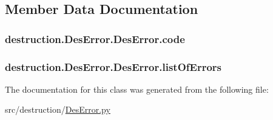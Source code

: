 \subsection{Member Data Documentation}
\hypertarget{classdestruction_1_1_des_error_1_1_des_error_a5d58c4eee2db20e1ebd7b920e5b7a2cd}{
\subsubsection[{code}]{\setlength{\rightskip}{0pt plus 5cm}destruction.\-Des\-Error.\-Des\-Error.\-code}}\label{classdestruction_1_1_des_error_1_1_des_error_a5d58c4eee2db20e1ebd7b920e5b7a2cd}
\hypertarget{classdestruction_1_1_des_error_1_1_des_error_a5c19a71b305265034b23a8bc9509518c}{
\subsubsection[{list\-Of\-Errors}]{\setlength{\rightskip}{0pt plus 5cm}destruction.\-Des\-Error.\-Des\-Error.\-list\-Of\-Errors}}\label{classdestruction_1_1_des_error_1_1_des_error_a5c19a71b305265034b23a8bc9509518c}


The documentation for this class was generated from the following file\-:\begin{DoxyCompactItemize}
\item 
src/destruction/\hyperlink{_des_error_8py}{Des\-Error.\-py}\end{DoxyCompactItemize}

